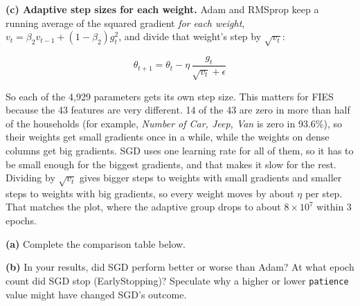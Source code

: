 \documentclass[12pt,a4paper]{article}
\begin{document}
\begin{answerbox}
\textbf{(c) Adaptive step sizes for each weight.} Adam and RMSprop keep a running average of the squared gradient \emph{for each weight}, \(v_t = \beta_2 v_{t-1} + (1-\beta_2)g_t^2\), and divide that weight's step by \(\sqrt{v_t}\):

\[\theta_{t+1} = \theta_t - \eta\,\frac{g_t}{\sqrt{v_t}+\epsilon}\]

So each of the 4,929 parameters gets its own step size. This matters for FIES because the 43 features are very different. 14 of the 43 are zero in more than half of the households (for example, \emph{Number of Car, Jeep, Van} is zero in 93.6\%), so their weights get small gradients once in a while, while the weights on dense columns get big gradients. SGD uses one learning rate for all of them, so it has to be small enough for the biggest gradients, and that makes it slow for the rest. Dividing by \(\sqrt{v_t}\) gives bigger steps to weights with small gradients and smaller steps to weights with big gradients, so every weight moves by about \(\eta\) per step. That matches the plot, where the adaptive group drops to about \(8\times10^7\) within 3 epochs.

\end{answerbox}

\begin{tcolorbox}[colback=lightblue!40, colframe=myColorB,
  title={\textbf{Question 3 — Adaptive vs.\ Non-Adaptive Optimizers} \hfill \normalfont(10 pts)},
  fonttitle=\normalsize\bfseries, breakable]

\textbf{(a)} Complete the comparison table below.

\textbf{(b)} In your results, did SGD perform better or worse than Adam? At what
epoch count did SGD stop (EarlyStopping)? Speculate why a higher or lower
\texttt{patience} value might have changed SGD's outcome.
\end{tcolorbox}
\end{document}
